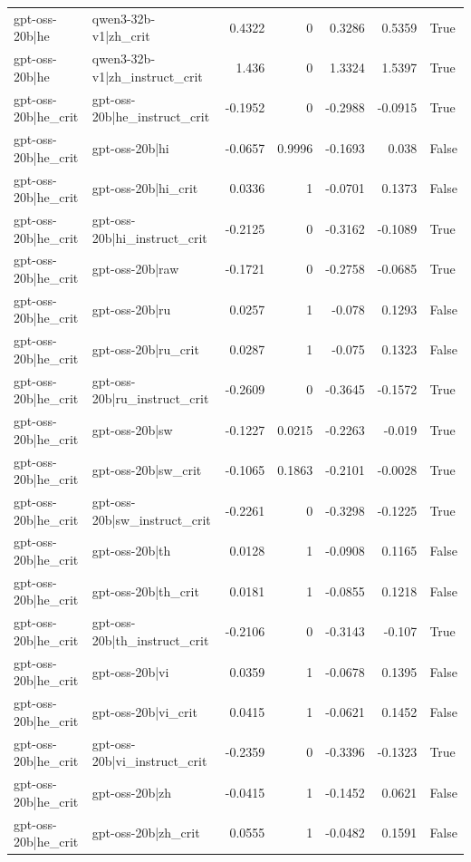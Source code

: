 \begin{table}
\begin{tabular}{l l r r r r l}
gpt-oss-20b|he & qwen3-32b-v1|zh_crit & 0.4322 & 0 & 0.3286 & 0.5359 & True \\
gpt-oss-20b|he & qwen3-32b-v1|zh_instruct_crit & 1.436 & 0 & 1.3324 & 1.5397 & True \\
gpt-oss-20b|he_crit & gpt-oss-20b|he_instruct_crit & -0.1952 & 0 & -0.2988 & -0.0915 & True \\
gpt-oss-20b|he_crit & gpt-oss-20b|hi & -0.0657 & 0.9996 & -0.1693 & 0.038 & False \\
gpt-oss-20b|he_crit & gpt-oss-20b|hi_crit & 0.0336 & 1 & -0.0701 & 0.1373 & False \\
gpt-oss-20b|he_crit & gpt-oss-20b|hi_instruct_crit & -0.2125 & 0 & -0.3162 & -0.1089 & True \\
gpt-oss-20b|he_crit & gpt-oss-20b|raw & -0.1721 & 0 & -0.2758 & -0.0685 & True \\
gpt-oss-20b|he_crit & gpt-oss-20b|ru & 0.0257 & 1 & -0.078 & 0.1293 & False \\
gpt-oss-20b|he_crit & gpt-oss-20b|ru_crit & 0.0287 & 1 & -0.075 & 0.1323 & False \\
gpt-oss-20b|he_crit & gpt-oss-20b|ru_instruct_crit & -0.2609 & 0 & -0.3645 & -0.1572 & True \\
gpt-oss-20b|he_crit & gpt-oss-20b|sw & -0.1227 & 0.0215 & -0.2263 & -0.019 & True \\
gpt-oss-20b|he_crit & gpt-oss-20b|sw_crit & -0.1065 & 0.1863 & -0.2101 & -0.0028 & True \\
gpt-oss-20b|he_crit & gpt-oss-20b|sw_instruct_crit & -0.2261 & 0 & -0.3298 & -0.1225 & True \\
gpt-oss-20b|he_crit & gpt-oss-20b|th & 0.0128 & 1 & -0.0908 & 0.1165 & False \\
gpt-oss-20b|he_crit & gpt-oss-20b|th_crit & 0.0181 & 1 & -0.0855 & 0.1218 & False \\
gpt-oss-20b|he_crit & gpt-oss-20b|th_instruct_crit & -0.2106 & 0 & -0.3143 & -0.107 & True \\
gpt-oss-20b|he_crit & gpt-oss-20b|vi & 0.0359 & 1 & -0.0678 & 0.1395 & False \\
gpt-oss-20b|he_crit & gpt-oss-20b|vi_crit & 0.0415 & 1 & -0.0621 & 0.1452 & False \\
gpt-oss-20b|he_crit & gpt-oss-20b|vi_instruct_crit & -0.2359 & 0 & -0.3396 & -0.1323 & True \\
gpt-oss-20b|he_crit & gpt-oss-20b|zh & -0.0415 & 1 & -0.1452 & 0.0621 & False \\
gpt-oss-20b|he_crit & gpt-oss-20b|zh_crit & 0.0555 & 1 & -0.0482 & 0.1591 & False \\

\end{tabular}
\end{table}
